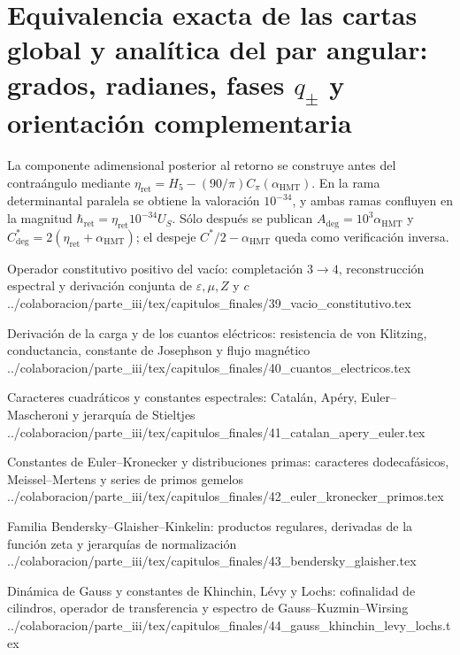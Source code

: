 \chapter{Equivalencia exacta de las cartas global y analítica del par angular: grados, radianes, fases \texorpdfstring{\(q_{\pm}\)}{q+/-} y orientación complementaria}
\label{chap:p3-final:38:angulo_contraangulo}
La componente adimensional posterior al retorno se construye antes del
contraángulo mediante
\(\eta_{\mathrm{ret}}=H_5-(90/\pi)C_\pi(\alpha_{\mathrm{HMT}})\).
En la rama determinantal paralela se obtiene la valoración \(10^{-34}\), y
ambas ramas confluyen en la magnitud
\(\hbar_{\mathrm{ret}}=\eta_{\mathrm{ret}}10^{-34}U_S\).
Sólo después se publican
\(A_{\mathrm{deg}}=10^3\alpha_{\mathrm{HMT}}\) y
\(C^*_{\mathrm{deg}}=2(\eta_{\mathrm{ret}}+\alpha_{\mathrm{HMT}})\);
el despeje \(C^*/2-\alpha_{\mathrm{HMT}}\) queda como verificación inversa.


\HMTSuccessorChapterInput
  {Operador constitutivo positivo del vacío: completación \(3\to4\), reconstrucción espectral y derivación conjunta de \texorpdfstring{\(\varepsilon,\mu,Z\)}{epsilon, mu, Z} y \(c\)}
  {../colaboracion/parte_iii/tex/capitulos_finales/39_vacio_constitutivo.tex}

\HMTSuccessorChapterInput
  {Derivación de la carga y de los cuantos eléctricos: resistencia de von Klitzing, conductancia, constante de Josephson y flujo magnético}
  {../colaboracion/parte_iii/tex/capitulos_finales/40_cuantos_electricos.tex}

\HMTSuccessorChapterInput
  {Caracteres cuadráticos y constantes espectrales: Catalán, Apéry, Euler--Mascheroni y jerarquía de Stieltjes}
  {../colaboracion/parte_iii/tex/capitulos_finales/41_catalan_apery_euler.tex}

\HMTSuccessorChapterInput
  {Constantes de Euler--Kronecker y distribuciones primas: caracteres dodecafásicos, Meissel--Mertens y series de primos gemelos}
  {../colaboracion/parte_iii/tex/capitulos_finales/42_euler_kronecker_primos.tex}

\HMTSuccessorChapterInput
  {Familia Bendersky--Glaisher--Kinkelin: productos regulares, derivadas de la función zeta y jerarquías de normalización}
  {../colaboracion/parte_iii/tex/capitulos_finales/43_bendersky_glaisher.tex}

\HMTSuccessorChapterInput
  {Dinámica de Gauss y constantes de Khinchin, Lévy y Lochs: cofinalidad de cilindros, operador de transferencia y espectro de Gauss--Kuzmin--Wirsing}
  {../colaboracion/parte_iii/tex/capitulos_finales/44_gauss_khinchin_levy_lochs.tex}

